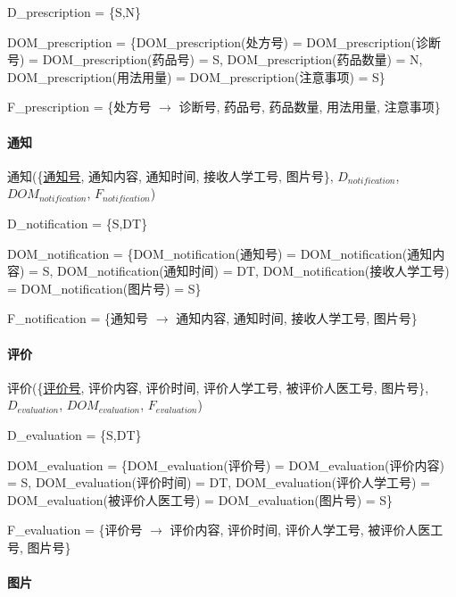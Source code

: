 \documentclass{article}
\begin{document}
D\_prescription = \{S,N\}

DOM\_prescription = \{DOM\_prescription(处方号) = DOM\_prescription(诊断号) = \newline DOM\_prescription(药品号) = S, DOM\_prescription(药品数量) = N, \newline DOM\_prescription(用法用量) = DOM\_prescription(注意事项) = S\}

F\_prescription = \{处方号 $\rightarrow$ 诊断号, 药品号, 药品数量, 用法用量, 注意事项\}

\paragraph{通知}

通知(\{\underline{通知号}, 通知内容, 通知时间, 接收人学工号, 图片号\}, $D_{notification}$, \newline $DOM_{notification}$, $F_{notification}$)

D\_notification = \{S,DT\}

DOM\_notification = \{DOM\_notification(通知号) = DOM\_notification(通知内容) = S, \newline DOM\_notification(通知时间) = DT, DOM\_notification(接收人学工号) = DOM\_notification(图片号) = S\}

F\_notification = \{通知号 $\rightarrow$ 通知内容, 通知时间, 接收人学工号, 图片号\}

\paragraph{评价}

评价(\{\underline{评价号}, 评价内容, 评价时间, 评价人学工号, 被评价人医工号, 图片号\}, $D_{evaluation}$, \newline $DOM_{evaluation}$, $F_{evaluation}$)

D\_evaluation = \{S,DT\}

DOM\_evaluation = \{DOM\_evaluation(评价号) = DOM\_evaluation(评价内容) = S, \newline DOM\_evaluation(评价时间) = DT, DOM\_evaluation(评价人学工号) = DOM\_evaluation(被评价人医工号) = DOM\_evaluation(图片号) = S\}

F\_evaluation = \{评价号 $\rightarrow$ 评价内容, 评价时间, 评价人学工号, 被评价人医工号, 图片号\}

\paragraph{图片}
\end{document}
